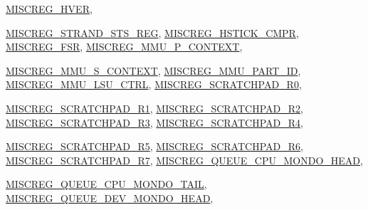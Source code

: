 \begin{DoxyCompactItemize}
\hyperlink{namespaceSparcISA_a1e522017e015d4c7efd6b2360143aa67a8df2029417601785fc04a3f19716ad58}{MISCREG\_\-HVER}, 
\par
\hyperlink{namespaceSparcISA_a1e522017e015d4c7efd6b2360143aa67a6db64638585b0cdd8b618fbf6cd308f1}{MISCREG\_\-STRAND\_\-STS\_\-REG}, 
\hyperlink{namespaceSparcISA_a1e522017e015d4c7efd6b2360143aa67a5d701b8bf22bdbe375434ef1e9af8d6a}{MISCREG\_\-HSTICK\_\-CMPR}, 
\hyperlink{namespaceSparcISA_a1e522017e015d4c7efd6b2360143aa67a168ce724204fbfc5402841da65ea3120}{MISCREG\_\-FSR}, 
\hyperlink{namespaceSparcISA_a1e522017e015d4c7efd6b2360143aa67a478dbe5c19351f5d7ce762be37fe0113}{MISCREG\_\-MMU\_\-P\_\-CONTEXT}, 
\par
\hyperlink{namespaceSparcISA_a1e522017e015d4c7efd6b2360143aa67aec4547f75bde7ae68baa50fbfdeb4478}{MISCREG\_\-MMU\_\-S\_\-CONTEXT}, 
\hyperlink{namespaceSparcISA_a1e522017e015d4c7efd6b2360143aa67abd6a0732761545e40b05fcd41bdfb340}{MISCREG\_\-MMU\_\-PART\_\-ID}, 
\hyperlink{namespaceSparcISA_a1e522017e015d4c7efd6b2360143aa67a4a6707e46e0beb2a7224bc0616d5971d}{MISCREG\_\-MMU\_\-LSU\_\-CTRL}, 
\hyperlink{namespaceSparcISA_a1e522017e015d4c7efd6b2360143aa67affc310b430a8d17b7eb47af9a193e41a}{MISCREG\_\-SCRATCHPAD\_\-R0}, 
\par
\hyperlink{namespaceSparcISA_a1e522017e015d4c7efd6b2360143aa67a05b4c23faf9641dd2d46eaa3b3e628ed}{MISCREG\_\-SCRATCHPAD\_\-R1}, 
\hyperlink{namespaceSparcISA_a1e522017e015d4c7efd6b2360143aa67a5085234ae1d0e3bfb572a240c06673f8}{MISCREG\_\-SCRATCHPAD\_\-R2}, 
\hyperlink{namespaceSparcISA_a1e522017e015d4c7efd6b2360143aa67a91d19fbf3f8dfd0c84b7d6459b7139ad}{MISCREG\_\-SCRATCHPAD\_\-R3}, 
\hyperlink{namespaceSparcISA_a1e522017e015d4c7efd6b2360143aa67a4456c17dffcd586476e0a6e38c822558}{MISCREG\_\-SCRATCHPAD\_\-R4}, 
\par
\hyperlink{namespaceSparcISA_a1e522017e015d4c7efd6b2360143aa67af799584c240f3ef33c20afc075a80c7c}{MISCREG\_\-SCRATCHPAD\_\-R5}, 
\hyperlink{namespaceSparcISA_a1e522017e015d4c7efd6b2360143aa67a70d6ff96a9996382fe622f5519f5ff75}{MISCREG\_\-SCRATCHPAD\_\-R6}, 
\hyperlink{namespaceSparcISA_a1e522017e015d4c7efd6b2360143aa67a765d3527bb6eae4a34fcaf2907e3d845}{MISCREG\_\-SCRATCHPAD\_\-R7}, 
\hyperlink{namespaceSparcISA_a1e522017e015d4c7efd6b2360143aa67a81ca66cee2aadc5cd33b8138db307849}{MISCREG\_\-QUEUE\_\-CPU\_\-MONDO\_\-HEAD}, 
\par
\hyperlink{namespaceSparcISA_a1e522017e015d4c7efd6b2360143aa67a1f59227222946d03011b7a1d0ecd4d2f}{MISCREG\_\-QUEUE\_\-CPU\_\-MONDO\_\-TAIL}, 
\hyperlink{namespaceSparcISA_a1e522017e015d4c7efd6b2360143aa67a6ffaee8faad748d1c061599eb1c510ee}{MISCREG\_\-QUEUE\_\-DEV\_\-MONDO\_\-HEAD}, 

\end{DoxyCompactItemize}
